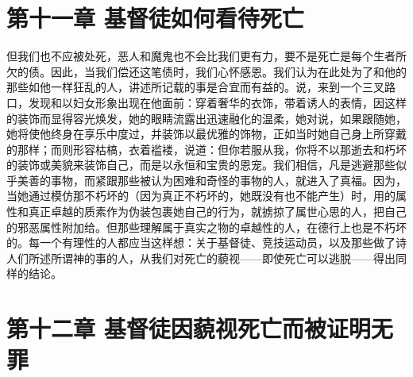 
\section{第十一章 基督徒如何看待死亡}

但我们也不应被处死，恶人和魔鬼也不会比我们更有力，要不是死亡是每个生者所欠的债。因此，当我们偿还这笔债时，我们心怀感恩。我们认为在此处为了和他的那些如他一样狂乱的人，讲述所记载的事是合宜而有益的。说，来到一个三叉路口，发现和以妇女形象出现在他面前：穿着奢华的衣饰，带着诱人的表情，因这样的装饰而显得容光焕发，她的眼睛流露出迅速融化的温柔，她对说，如果跟随她，她将使他终身在享乐中度过，并装饰以最优雅的饰物，正如当时她自己身上所穿戴的那样；而则形容枯槁，衣着褴褛，说道：但你若服从我，你将不以那逝去和朽坏的装饰或美貌来装饰自己，而是以永恒和宝贵的恩宠。我们相信，凡是逃避那些似乎美善的事物，而紧跟那些被认为困难和奇怪的事物的人，就进入了真福。因为，当她通过模仿那不朽坏的（因为真正不朽坏的，她既没有也不能产生）时，用的属性和真正卓越的质素作为伪装包裹她自己的行为，就掳掠了属世心思的人，把自己的邪恶属性附加给。但那些理解属于真实之物的卓越性的人，在德行上也是不朽坏的。每一个有理性的人都应当这样想：关于基督徒、竞技运动员，以及那些做了诗人们所述所谓神的事的人，从我们对死亡的藐视——即使死亡可以逃脱——得出同样的结论。\par


\section{第十二章 基督徒因藐视死亡而被证明无罪}

